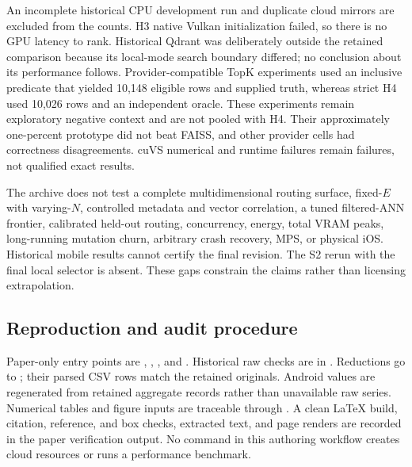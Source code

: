 An incomplete historical CPU development run and duplicate cloud mirrors are excluded from the counts. H3 native Vulkan initialization failed, so there is no GPU latency to rank. Historical Qdrant was deliberately outside the retained comparison because its local-mode search boundary differed; no conclusion about its performance follows. Provider-compatible TopK experiments used an inclusive predicate that yielded 10,148 eligible rows and supplied truth, whereas strict H4 used 10,026 rows and an independent oracle. These experiments remain exploratory negative context and are not pooled with H4. Their approximately one-percent prototype did not beat FAISS, and other provider cells had correctness disagreements. cuVS numerical and runtime failures remain failures, not qualified exact results.

The archive does not test a complete multidimensional routing surface, fixed-$E$ with varying-$N$, controlled metadata and vector correlation, a tuned filtered-ANN frontier, calibrated held-out routing, concurrency, energy, total VRAM peaks, long-running mutation churn, arbitrary crash recovery, MPS, or physical iOS. Historical mobile results cannot certify the final revision. The S2 rerun with the final local selector is absent. These gaps constrain the claims rather than licensing extrapolation.

\subsection{Reproduction and audit procedure}
Paper-only entry points are , , , and . Historical raw checks are in . Reductions go to ; their parsed CSV rows match the retained originals. Android values are regenerated from retained aggregate records rather than unavailable raw series. Numerical tables and figure inputs are traceable through . A clean LaTeX build, citation, reference, and box checks, extracted text, and page renders are recorded in the paper verification output. No command in this authoring workflow creates cloud resources or runs a performance benchmark.
